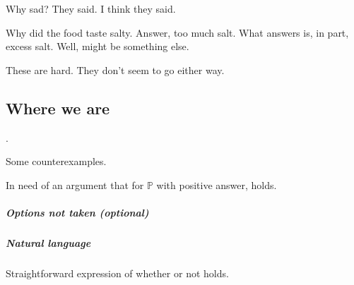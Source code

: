 \begin{note}
  Why sad?
  They said.
  I think they said.

  Why did the food taste salty.
  Answer, too much salt.
  What answers is, in part, excess salt.
  Well, might be something else.

  {
    \color{red}
    These are hard.
    They don't seem to go either way.
  }
\end{note}

\subsection{Where we are}
\label{sec:where-we-are}

\begin{note}
  .

  Some counterexamples.

  In need of an argument that for \(\mathbb{P}\) with positive answer, \ptivity{} holds.
\end{note}

\subparagraph{Options not taken (optional)}

\subparagraph{Natural language}

\begin{note}
  Straightforward expression of whether or not \ptivity{} holds.
\end{note}


